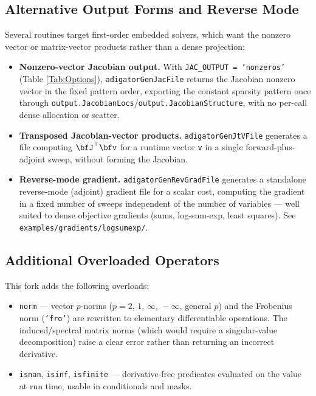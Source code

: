 \documentclass[10pt,pdftex]{article}
\begin{document}
\subsection{Alternative Output Forms and Reverse Mode}\label{SubSec:OutputForms}
Several routines target first-order embedded solvers, which want the nonzero vector or matrix-vector products rather than a dense projection:
\begin{itemize}
\item {\bf Nonzero-vector Jacobian output.} With \texttt{JAC\_OUTPUT = 'nonzeros'} (Table \ref{Tab:Options}), \texttt{adigatorGenJacFile} returns the Jacobian nonzero vector in the fixed pattern order, exporting the constant sparsity pattern once through \texttt{output.JacobianLocs}/\texttt{output.JacobianStructure}, with no per-call dense allocation or scatter.
\item {\bf Transposed Jacobian-vector products.} \texttt{adigatorGenJtVFile} generates a file computing $\bfJ^\top \bfv$ for a runtime vector \texttt{v} in a single forward-plus-adjoint sweep, without forming the Jacobian.
\item {\bf Reverse-mode gradient.} \texttt{adigatorGenRevGradFile} generates a standalone reverse-mode (adjoint) gradient file for a scalar cost, computing the gradient in a fixed number of sweeps independent of the number of variables --- well suited to dense objective gradients (sums, log-sum-exp, least squares). See \texttt{examples/gradients/logsumexp/}.
\end{itemize}

\subsection{Additional Overloaded Operators}\label{SubSec:Operators}
This fork adds the following overloads:
\begin{itemize}
\item \texttt{norm} --- vector $p$-norms ($p = 2,\,1,\,\infty,\,-\infty$, general $p$) and the Frobenius norm (\texttt{'fro'}) are rewritten to elementary differentiable operations. The induced/spectral matrix norms (which would require a singular-value decomposition) raise a clear error rather than returning an incorrect derivative.
\item \texttt{isnan}, \texttt{isinf}, \texttt{isfinite} --- derivative-free predicates evaluated on the value at run time, usable in conditionals and masks.
\end{itemize}
\end{document}
